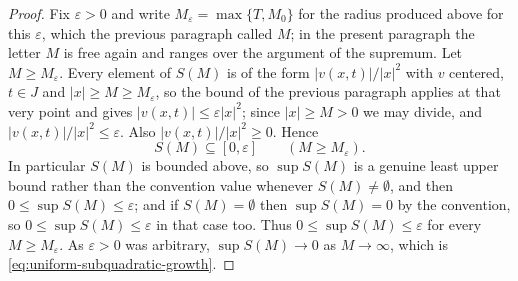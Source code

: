 \begin{proof}
Fix $\varepsilon>0$ and write $M_\varepsilon=\max\{T,M_0\}$ for the radius
produced above for this $\varepsilon$, which the previous paragraph called $M$;
in the present paragraph the letter $M$ is free again and ranges over the
argument of the supremum. Let $M\ge M_\varepsilon$. Every element of $S(M)$
is of the form $|v(x,t)|/|x|^2$ with $v$ centered, $t\in J$ and
$|x|\ge M\ge M_\varepsilon$, so the bound of the previous paragraph applies at
that very point and gives $|v(x,t)|\le\varepsilon|x|^2$; since $|x|\ge M>0$ we
may divide, and $|v(x,t)|/|x|^2\le\varepsilon$. Also
$|v(x,t)|/|x|^2\ge0$. Hence
\[
  S(M)\subseteq[0,\varepsilon]\qquad(M\ge M_\varepsilon).
\]
In particular $S(M)$ is bounded above, so $\sup S(M)$ is a genuine least upper
bound rather than the convention value whenever $S(M)\ne\emptyset$, and then
$0\le\sup S(M)\le\varepsilon$; and if $S(M)=\emptyset$ then $\sup S(M)=0$ by the
convention, so $0\le\sup S(M)\le\varepsilon$ in that case too. Thus
$0\le\sup S(M)\le\varepsilon$ for every $M\ge M_\varepsilon$. As $\varepsilon>0$
was arbitrary, $\sup S(M)\to0$ as $M\to\infty$, which is
\eqref{eq:uniform-subquadratic-growth}.
\end{proof}

